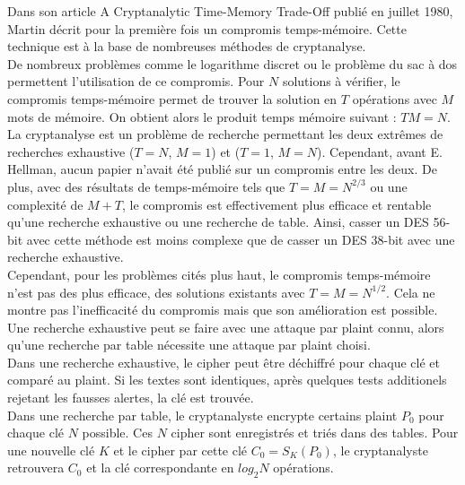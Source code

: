 
	Dans son article \og{}A Cryptanalytic Time-Memory Trade-Off\fg{}\cite{ehellman} publié en juillet 1980, Martin  décrit pour la première fois un compromis temps-mémoire. Cette technique est à la base de nombreuses méthodes de cryptanalyse.\\

	De nombreux problèmes comme le logarithme discret ou le problème du sac à dos permettent l'utilisation de ce compromis. Pour $N$ solutions à vérifier, le compromis temps-mémoire permet de trouver la solution en $T$ opérations avec $M$ mots de mémoire. On obtient alors le produit temps mémoire suivant : $TM = N$.\\

	La cryptanalyse est un problème de recherche permettant les deux extrêmes de recherches exhaustive ($T=N$, $M=1$) et ($T=1$, $M=N$). Cependant, avant E. Hellman\cite{ehellman}, aucun papier n'avait été publié sur un compromis entre les deux. De plus, avec des résultats de temps-mémoire tels que $T = M = N^{2/3}$ ou une complexité de $M + T$, le compromis est effectivement plus efficace et rentable qu'une recherche exhaustive ou une recherche de table. Ainsi, casser un DES 56-bit avec cette méthode est moins complexe que de casser un DES 38-bit avec une recherche exhaustive.\\

	Cependant, pour les problèmes cités plus haut, le compromis temps-mémoire n'est pas des plus efficace, des solutions existants avec $T = M = N^{1/2}$. Cela ne montre pas l'inefficacité du compromis mais que son amélioration est possible.\\

	Une recherche exhaustive peut se faire avec une attaque par \gls{plaint} connu, alors qu'une recherche par table nécessite une attaque par \gls{plaint} choisi.\\

	Dans une recherche exhaustive, le \gls{cipher} peut être déchiffré pour chaque clé et comparé au \gls{plaint}. Si les textes sont identiques, après quelques tests additionels rejetant les fausses alertes, la clé est trouvée.\\

	Dans une recherche par table, le cryptanalyste encrypte certains \gls{plaint} $P_0$ pour chaque clé $N$ possible. Ces $N$ \gls{cipher} sont enregistrés et triés dans des tables. Pour une nouvelle clé $K$ et le \gls{cipher} par cette clé $C_0 = S_K(P_0)$, le cryptanalyste retrouvera $C_0$ et la clé correspondante en $log_2 N$ opérations.\\


